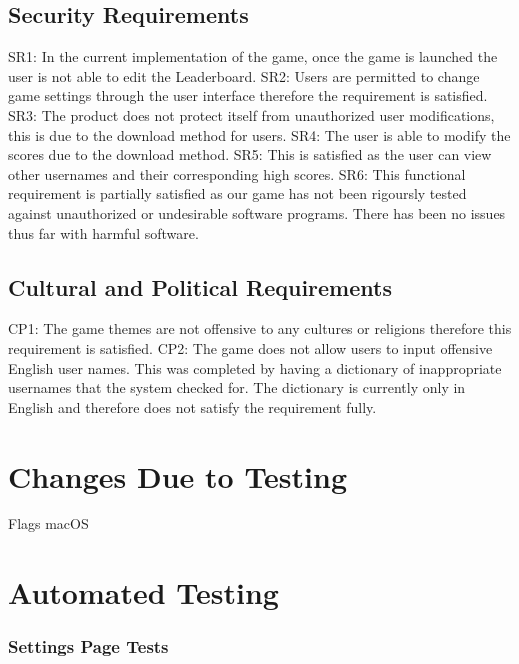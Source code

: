 \documentclass[12pt, titlepage]{article}
\begin{document}
	\subsection{Security Requirements}	
	SR1: In the current implementation of the game, once the game is launched the user is not able to edit the Leaderboard. 
	SR2: Users are permitted to change game settings through the user interface therefore the requirement is satisfied. 
	SR3: The product does not protect itself from unauthorized user modifications, this is due to the download method for users. 
	SR4: The user is able to modify the scores due to the download method. 
	SR5: This is satisfied as the user can view other usernames and their corresponding high scores. 
	SR6: This functional requirement is partially satisfied as our game has not been rigoursly tested against unauthorized or undesirable software programs. There has been no issues thus far with harmful software. 
	
	\subsection{Cultural and Political Requirements}
	CP1: The game themes are not offensive to any cultures or religions therefore this requirement is satisfied. 
	CP2: The game does not allow users to input offensive English user names. This was completed by having a dictionary of inappropriate usernames that the system checked for. The dictionary is currently only in English and therefore does not satisfy the requirement fully. 
	
	\section{Changes Due to Testing}
	
	
	Flags
	macOS
	
	
	
	\section{Automated Testing}
	\subsubsection{Settings Page Tests}
	
\end{document}
